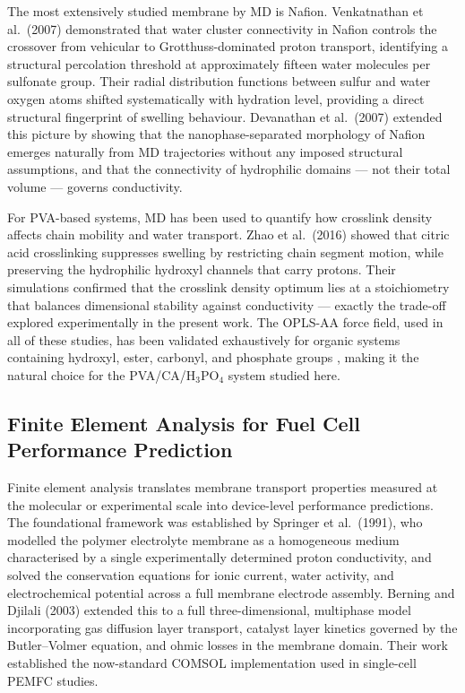 \documentclass[12pt,a4paper]{report}
\begin{document}
The most extensively studied membrane by MD is Nafion. Venkatnathan 
et al.\ (2007) demonstrated that water cluster connectivity in Nafion 
controls the crossover from vehicular to Grotthuss-dominated proton 
transport, identifying a structural percolation threshold at 
approximately fifteen water molecules per sulfonate group. Their 
radial distribution functions between sulfur and water oxygen atoms 
shifted systematically with hydration level, providing a direct 
structural fingerprint of swelling behaviour. Devanathan et al.\ 
(2007) extended this picture by showing that the nanophase-separated 
morphology of Nafion emerges naturally from MD trajectories without 
any imposed structural assumptions, and that the connectivity of 
hydrophilic domains — not their total volume — governs conductivity.

For PVA-based systems, MD has been used to quantify how crosslink 
density affects chain mobility and water transport. Zhao et al.\ 
(2016) showed that citric acid crosslinking suppresses swelling by 
restricting chain segment motion, while preserving the hydrophilic 
hydroxyl channels that carry protons. Their simulations confirmed that 
the crosslink density optimum lies at a stoichiometry that balances 
dimensional stability against conductivity — exactly the trade-off 
explored experimentally in the present work. The OPLS-AA force field, 
used in all of these studies, has been validated exhaustively for 
organic systems containing hydroxyl, ester, carbonyl, and phosphate 
groups \cite{95}, making it the natural choice for the 
PVA/CA/H\(_3\)PO\(_4\) system studied here.

\subsection{Finite Element Analysis for Fuel Cell Performance 
Prediction}

Finite element analysis translates membrane transport properties 
measured at the molecular or experimental scale into device-level 
performance predictions. The foundational framework was established 
by Springer et al.\ (1991), who modelled the polymer electrolyte 
membrane as a homogeneous medium characterised by a single 
experimentally determined proton conductivity, and solved the 
conservation equations for ionic current, water activity, and 
electrochemical potential across a full membrane electrode assembly. 
Berning and Djilali (2003) extended this to a full three-dimensional, 
multiphase model incorporating gas diffusion layer transport, catalyst 
layer kinetics governed by the Butler--Volmer equation, and ohmic 
losses in the membrane domain. Their work established the now-standard 
COMSOL implementation used in single-cell PEMFC studies.
\end{document}
